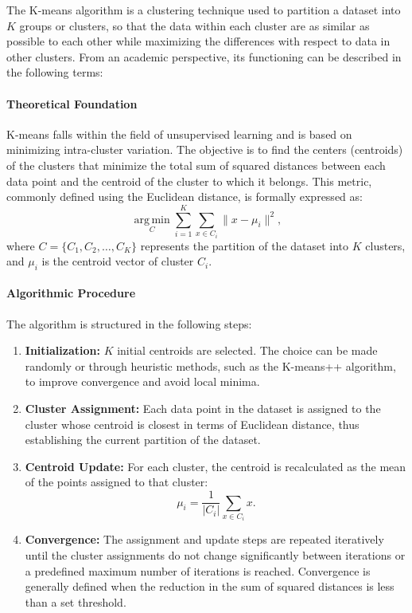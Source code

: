 \documentclass[10pt]{article}
\begin{document}
The K-means algorithm is a clustering technique used to partition a dataset into $K$ groups or clusters, so that the data within each cluster are as similar as possible to each other while maximizing the differences with respect to data in other clusters. From an academic perspective, its functioning can be described in the following terms:

\paragraph{Theoretical Foundation}  
K-means falls within the field of unsupervised learning and is based on minimizing intra-cluster variation. The objective is to find the centers (centroids) of the clusters that minimize the total sum of squared distances between each data point and the centroid of the cluster to which it belongs. This metric, commonly defined using the Euclidean distance, is formally expressed as:
\[
\underset{C}{\operatorname{arg\,min}} \sum_{i=1}^{K} \sum_{x \in C_i} \|x - \mu_i\|^2,
\]
where $C = \{C_1, C_2, \ldots, C_K\}$ represents the partition of the dataset into $K$ clusters, and $\mu_i$ is the centroid vector of cluster $C_i$.

\paragraph{Algorithmic Procedure}  
The algorithm is structured in the following steps:
\begin{enumerate}
    \item \textbf{Initialization:} $K$ initial centroids are selected. The choice can be made randomly or through heuristic methods, such as the K-means++ algorithm, to improve convergence and avoid local minima.
    \item \textbf{Cluster Assignment:} Each data point in the dataset is assigned to the cluster whose centroid is closest in terms of Euclidean distance, thus establishing the current partition of the dataset.
    \item \textbf{Centroid Update:} For each cluster, the centroid is recalculated as the mean of the points assigned to that cluster:
    \[
    \mu_i = \frac{1}{\lvert C_i \rvert} \sum_{x \in C_i} x.
    \]
    \item \textbf{Convergence:} The assignment and update steps are repeated iteratively until the cluster assignments do not change significantly between iterations or a predefined maximum number of iterations is reached. Convergence is generally defined when the reduction in the sum of squared distances is less than a set threshold.
\end{enumerate}
\end{document}

